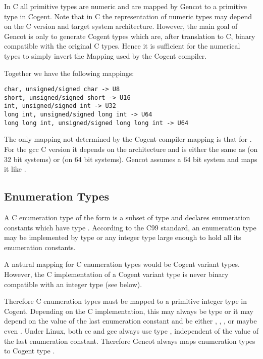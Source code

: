 In C all primitive types are numeric and are mapped by Gencot to a primitive type in Cogent. Note that in C the representation 
of numeric types may depend on the C version and target system architecture. However, the main goal of Gencot is only to generate
Cogent types which are, after translation to C, binary compatible with the original C types. Hence it is sufficient for the numerical 
types to simply invert the Mapping used by the Cogent compiler.

Together we have the following mappings:
\begin{verbatim}
char, unsigned/signed char -> U8
short, unsigned/signed short -> U16
int, unsigned/signed int -> U32
long int, unsigned/signed long int -> U64
long long int, unsigned/signed long long int -> U64
\end{verbatim}

The only mapping not determined by the Cogent compiler mapping is that for . For the gcc C version 
it depends on the architecture and is either the same as  (on 32 bit systems) or 
(on 64 bit systems). Gencot assumes a 64 bit system and maps it like .

\subsection{Enumeration Types}
\label{design-types-enum}

A C enumeration type of the form  is a subset of type  and declares enumeration 
constants which have type . According to the C99 standard, an enumeration type may be implemented
by type  or any integer type large enough to hold all its enumeration constants.

A natural mapping for C enumeration types would be Cogent variant types. However, the C implementation
of a Cogent variant type is never binary compatible with an integer type (see below). 

Therefore C enumeration types must be mapped to a primitive integer type in Cogent. Depending on the C
implementation, this may always be type  or it may depend on the value of the last enumeration
constant and be either , , , or maybe even . Under Linux, both cc
and gcc always use type , independent of the value of the last enumeration constant. 
Therefore Gencot always maps enumeration types to Cogent type .

